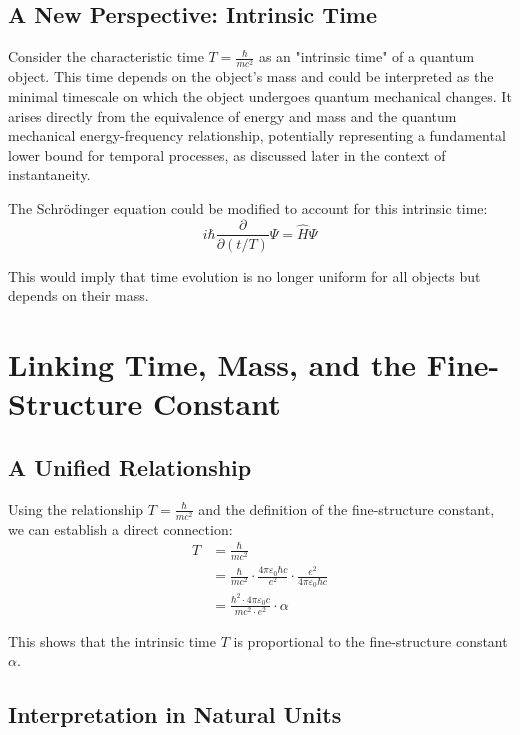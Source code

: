 \documentclass{article}
\begin{document}
	\subsection{A New Perspective: Intrinsic Time}
	
	Consider the characteristic time $T = \frac{\hbar}{mc^2}$ as an "intrinsic time" of a quantum object. This time depends on the object’s mass and could be interpreted as the minimal timescale on which the object undergoes quantum mechanical changes. It arises directly from the equivalence of energy and mass and the quantum mechanical energy-frequency relationship, potentially representing a fundamental lower bound for temporal processes, as discussed later in the context of instantaneity.
	
	The Schrödinger equation could be modified to account for this intrinsic time:
	\begin{equation}
		i\hbar \frac{\partial}{\partial (t/T)}\Psi = \hat{H}\Psi
	\end{equation}
	
	This would imply that time evolution is no longer uniform for all objects but depends on their mass.
	
	\section{Linking Time, Mass, and the Fine-Structure Constant}
	
	\subsection{A Unified Relationship}
	
	Using the relationship $T = \frac{\hbar}{mc^2}$ and the definition of the fine-structure constant, we can establish a direct connection:
	\begin{align}
		T &= \frac{\hbar}{mc^2} \\
		&= \frac{\hbar}{mc^2} \cdot \frac{4\pi\varepsilon_0\hbar c}{e^2} \cdot \frac{e^2}{4\pi\varepsilon_0\hbar c} \\
		&= \frac{\hbar^2 \cdot 4\pi\varepsilon_0 c}{mc^2 \cdot e^2} \cdot \alpha
	\end{align}
	
	This shows that the intrinsic time $T$ is proportional to the fine-structure constant $\alpha$.
	
	\subsection{Interpretation in Natural Units}
	
\end{document}
